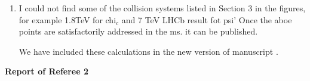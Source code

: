 \documentclass[aps,prc,preprint,superscriptaddress,showpacs,showkeys,amsmath]{revtex4-1}
\newcommand{\barc}{{\bar{c}}}
\begin{document}
\begin{enumerate}
{  %

}



\item I could not find some of the collision systems listed in Section 3 in the
figures, for example 1.8TeV for chi$_c$ and 7 TeV LHCb result fot psi'
Once the aboe points are satisfactorily addressed in the ms. it can be
published.

{\color{blue} 
We have included these calculations in the new version of manuscript .
}



\end{enumerate}









{\bf Report of Referee 2 } \\
\end{document}
